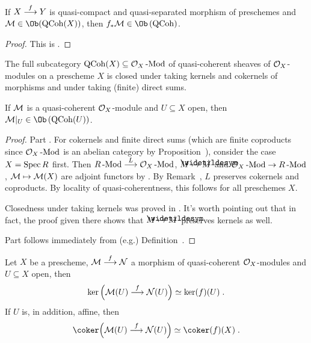 \documentclass[a4paper,parskip=half,numbers=enddot, DIV=12]{scrreprt}
\begin{document}
\begin{prop}
	If $X\morphism[f]Y$ is quasi-compact and quasi-separated morphism of preschemes and $\Mm\in\Ob(\cat{QCoh}(X))$, then $f_*\Mm\in\Ob\left(\cat{QCoh}\right)$.
\end{prop}
\begin{proof}
	This is \cite[Proposition~1.5.2]{alggeo1}.
\end{proof}
\begin{prop}
	\begin{alphanumerate}
		\item {}The full subcategory $\operatorname{QCoh}(X)\subseteq\mathcal{O}_X\operatorname{-Mod}$ of quasi-coherent sheaves of $\mathcal{O}_X$-modules on a prescheme $X$ is closed under taking kernels and cokernels of morphisms and under taking (finite) direct sums.
		\item If $\mathcal{M}$ is a quasi-coherent $\mathcal{O}_X$-module and $U\subseteq X$ open, then $\Mm|_U\in\Ob\left(\cat{QCoh}(U)\right)$.
	\end{alphanumerate}
\end{prop}
\begin{proof}
	Part . For cokernels and finite direct sums (which are finite coproducts since $\mathcal{O}_X\operatorname{-Mod}$ is an abelian category by Proposition~), consider the case $X=\operatorname{Spec} R$ first. Then $R\cat{-Mod}\morphism[L]\Oo_X\cat{-Mod}$, $M\mapsto\snake{M}$ and $\Oo_X\cat{-Mod}\morphism R\cat{-Mod}$, $\mathcal{M}\mapsto\mathcal{M}(X)$ are adjoint functors by . By Remark~, $L$ preserves cokernels and coproducts. By locality of quasi-coherentness, this follows for all preschemes $X$.
	
	Closedness under taking kernels was proved in \cite[Fact~1.5.3]{alggeo1}. It's worth pointing out that in fact, the proof given there shows that $M\mapsto\snake{M}$ preserves kernels as well. 
	
	Part  follows immediately from (e.g.) Definition~.
\end{proof}
\begin{cor}
	Let $X$ be a prescheme, $\Mm\morphism[f]\Nn$ a morphism of quasi-coherent $\mathcal{O}_X$-modules and $U\subseteq X$ open, then
	\begin{align*}
		\ker\Big(\Mm(U)\morphism[f]\Nn(U)\Big)\simeq\ker(f)(U)\;.
	\end{align*}
	If $U$ is, in addition, affine, then
	\begin{align*}
		\coker\Big(\Mm(U)\morphism[f]\Nn(U)\Big)\simeq\coker(f)(X)\;.
	\end{align*}
\end{cor}
\end{document}
